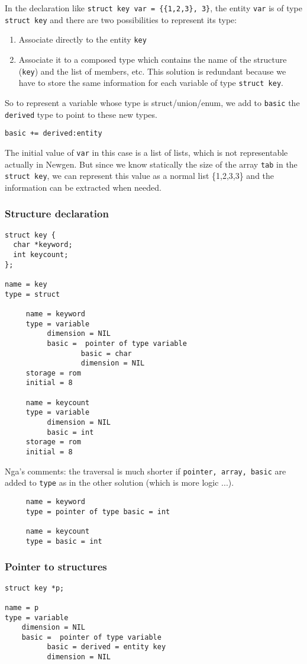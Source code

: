\documentclass[a4paper]{article}
\begin{document}
In the declaration like \verb/struct key var = {{1,2,3}, 3}/, the entity
\verb/var/ is of type \verb/struct key/ and there are two possibilities to
represent its type: 
\begin{enumerate}
\item Associate directly  to the entity \verb/key/
\item Associate it to a composed type which contains the name of the structure (\verb/key/)
and the list of
members, etc. This solution is redundant because we have to store the same
information for each variable of type
\verb/struct key/. 
\end{enumerate}
So to represent a variable whose type is struct/union/enum, we add to \verb/basic/ the \verb/derived/ type to point to
these new types. 

\verb/basic += derived:entity/

The initial value of \verb/var/ in this case is a list of lists, which is
not representable actually in Newgen. But since we know statically the
size of the array \verb/tab/ in the \verb/struct key/, we can represent
this value as a normal list \{1,2,3,3\} and the information can be extracted
when needed. 
\subsubsection{Structure declaration}
\begin{verbatim}
struct key {
  char *keyword;
  int keycount;
};

name = key
type = struct 

     name = keyword
     type = variable
          dimension = NIL
          basic =  pointer of type variable
                  basic = char
                  dimension = NIL
     storage = rom
     initial = 8

     name = keycount
     type = variable
          dimension = NIL
          basic = int
     storage = rom
     initial = 8
\end{verbatim}
Nga's comments: the traversal is much shorter if 
\verb/pointer, array, basic/ are added to \verb/type/ as in the other
solution (which is more logic ...).
\begin{verbatim}
     name = keyword
     type = pointer of type basic = int

     name = keycount
     type = basic = int
\end{verbatim}
\subsubsection{Pointer to structures}
\begin{verbatim}
struct key *p;

name = p
type = variable
    dimension = NIL
    basic =  pointer of type variable
          basic = derived = entity key
          dimension = NIL
\end{verbatim}
\end{document}
